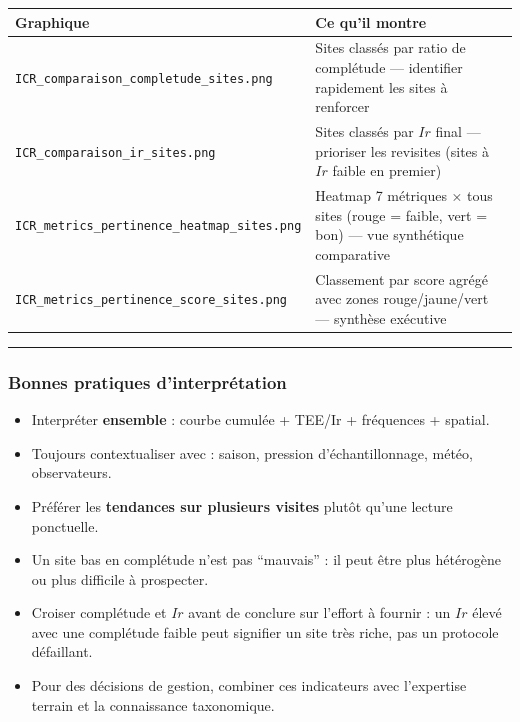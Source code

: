 {\def\LTcaptype{none} %
\begin{longtable}[]{@{}
  >{\raggedright\arraybackslash}p{}
  >{\raggedright\arraybackslash}p{}@{}}
\toprule\noalign{}
\begin{minipage}[b]{\linewidth}\raggedright
Graphique
\end{minipage} & \begin{minipage}[b]{\linewidth}\raggedright
Ce qu'il montre
\end{minipage} \\
\midrule\noalign{}
\endhead
\bottomrule\noalign{}
\endlastfoot
\texttt{ICR\_comparaison\_completude\_sites.png} & Sites classés par
ratio de complétude --- identifier rapidement les sites à renforcer \\
\texttt{ICR\_comparaison\_ir\_sites.png} & Sites classés par \(Ir\)
final --- prioriser les revisites (sites à \(Ir\) faible en premier) \\
\texttt{ICR\_metrics\_pertinence\_heatmap\_sites.png} & Heatmap 7
métriques × tous sites (rouge = faible, vert = bon) --- vue synthétique
comparative \\
\texttt{ICR\_metrics\_pertinence\_score\_sites.png} & Classement par
score agrégé avec zones rouge/jaune/vert --- synthèse exécutive \\
\end{longtable}
}

\begin{center}\rule{0.5\linewidth}{0.5pt}\end{center}

\subsubsection{Bonnes pratiques
d'interprétation}\label{bonnes-pratiques-dinterpruxe9tation}

\begin{itemize}
\tightlist
\item
  Interpréter \textbf{ensemble} : courbe cumulée + TEE/Ir + fréquences +
  spatial.
\item
  Toujours contextualiser avec : saison, pression d'échantillonnage,
  météo, observateurs.
\item
  Préférer les \textbf{tendances sur plusieurs visites} plutôt qu'une
  lecture ponctuelle.
\item
  Un site bas en complétude n'est pas ``mauvais'' : il peut être plus
  hétérogène ou plus difficile à prospecter.
\item
  Croiser complétude et \(Ir\) avant de conclure sur l'effort à fournir
  : un \(Ir\) élevé avec une complétude faible peut signifier un site
  très riche, pas un protocole défaillant.
\item
  Pour des décisions de gestion, combiner ces indicateurs avec
  l'expertise terrain et la connaissance taxonomique.
\end{itemize}

